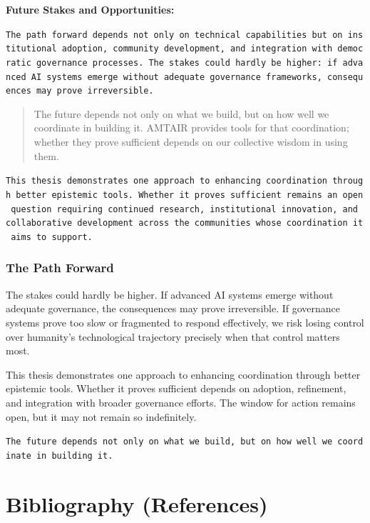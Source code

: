 \documentclass[
  11pt,
  letterpaper,
]{book}
\begin{document}
\textbf{Future Stakes and Opportunities:}

\texttt{The\ path\ forward\ depends\ not\ only\ on\ technical\ capabilities\ but\ on\ institutional\ adoption,\ community\ development,\ and\ integration\ with\ democratic\ governance\ processes.\ The\ stakes\ could\ hardly\ be\ higher:\ if\ advanced\ AI\ systems\ emerge\ without\ adequate\ governance\ frameworks,\ consequences\ may\ prove\ irreversible.}

\begin{quote}
The future depends not only on what we build, but on how well we
coordinate in building it. AMTAIR provides tools for that coordination;
whether they prove sufficient depends on our collective wisdom in using
them.
\end{quote}

\texttt{This\ thesis\ demonstrates\ one\ approach\ to\ enhancing\ coordination\ through\ better\ epistemic\ tools.\ Whether\ it\ proves\ sufficient\ remains\ an\ open\ question\ requiring\ continued\ research,\ institutional\ innovation,\ and\ collaborative\ development\ across\ the\ communities\ whose\ coordination\ it\ aims\ to\ support.}

\subsection{The Path Forward}\label{sec-path-forward}

The stakes could hardly be higher. If advanced AI systems emerge without
adequate governance, the consequences may prove irreversible. If
governance systems prove too slow or fragmented to respond effectively,
we risk losing control over humanity's technological trajectory
precisely when that control matters most.

This thesis demonstrates one approach to enhancing coordination through
better epistemic tools. Whether it proves sufficient depends on
adoption, refinement, and integration with broader governance efforts.
The window for action remains open, but it may not remain so
indefinitely.

\texttt{The\ future\ depends\ not\ only\ on\ what\ we\ build,\ but\ on\ how\ well\ we\ coordinate\ in\ building\ it.}


\chapter*{Bibliography (References)}\label{bibliography-references}
\end{document}
